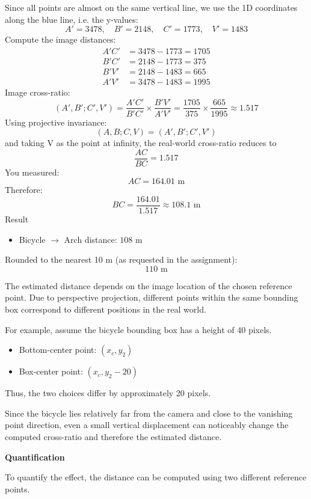 \documentclass[12pt,a4paper]{article}
\newenvironment{studentSpace}{\par\medskip\noindent}{\par\bigskip}
\begin{document}
\begin{studentSpace}
Since all points are almost on the same vertical line, we use the 1D coordinates along the blue line, i.e. the y-values:
\[
A' = 3478,\quad B' = 2148,\quad C' = 1773,\quad V' = 1483
\]
Compute the image distances:
\begin{align*}
A'C' &= 3478 - 1773 = 1705 \\
B'C' &= 2148 - 1773 = 375 \\
B'V' &= 2148 - 1483 = 665 \\
A'V' &= 3478 - 1483 = 1995
\end{align*}
Image cross-ratio:
\[
(A', B'; C', V') = \frac{A'C'}{B'C'} \times \frac{B'V'}{A'V'} = \frac{1705}{375} \times \frac{665}{1995} \approx 1.517
\]
Using projective invariance:
\[
(A, B; C, V) = (A', B'; C', V')
\]
and taking V as the point at infinity, the real-world cross-ratio reduces to
\[
\frac{AC}{BC} = 1.517
\]
You measured:
\[
AC = 164.01 \text{ m}
\]
Therefore:
\[
BC = \frac{164.01}{1.517} \approx 108.1 \text{ m}
\]
Result

\begin{itemize}
\item Bicycle $\to$ Arch distance: $\boxed{108 \text{ m}}$
\end{itemize}

Rounded to the nearest 10 m (as requested in the assignment):
\[
\boxed{110 \text{ m}}
\]

The estimated distance depends on the image location of the chosen reference point. Due to perspective projection, different points within the same bounding box correspond to different positions in the real world.

For example, assume the bicycle bounding box has a height of 40 pixels.
\begin{itemize}
\item Bottom-center point: $(x_c, y_2)$
\item Box-center point: $(x_c, y_2 - 20)$
\end{itemize}
Thus, the two choices differ by approximately 20 pixels.

Since the bicycle lies relatively far from the camera and close to the vanishing point direction, even a small vertical displacement can noticeably change the computed cross-ratio and therefore the estimated distance.

\textbf{Quantification}

To quantify the effect, the distance can be computed using two different reference points.


\end{studentSpace}
\end{document}
